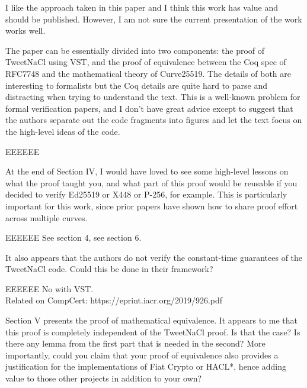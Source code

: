 \begin{center}
\end{center}

I like the approach taken in this paper and I think this work has value and
should be published.
However, I am not sure the current presentation of the work works well.

The paper can be essentially divided into two components: the proof of TweetNaCl
using VST, and the proof of equivalence between the Coq spec of RFC7748 and the
mathematical theory of Curve25519.  The details of both are interesting to
formalists but the Coq details are quite hard to parse and distracting when
trying to understand the text. This is a well-known problem for formal
verification papers, and I don't have great advice except to suggest that the
authors separate out the code fragments into figures and let the text focus
on the high-level ideas of the code.

\begin{answer}{EEEEEE}
\end{answer}

At the end of Section IV, I would have loved to see some high-level lessons on
what the proof taught you, and what part of this proof would be reusable if you
decided to verify Ed25519 or X448 or P-256, for example. This is particularly
important for this work, since prior papers have shown how to share proof effort
across multiple curves.

\begin{answer}{EEEEEE}
See section 4, see section 6.
\end{answer}

It also appears that the authors do not verify the constant-time guarantees of
the TweetNaCl code. Could this be done in their framework?

\begin{answer}{EEEEEE}
No with VST.\\
Related on CompCert: https://eprint.iacr.org/2019/926.pdf
\end{answer}

Section V presents the proof of mathematical equivalence. It appears to me that
this proof is completely independent of the TweetNaCl proof. Is that the case?
Is there any lemma from the first part that is needed in the second? More
importantly, could you claim that your proof of equivalence also provides a
justification for the implementations of Fiat Crypto or HACL*, hence adding
value to those other projects in addition to your own?

